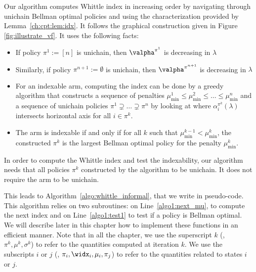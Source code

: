 Our algorithm computes Whittle index in increasing order by navigating through unichain Bellman optimal policies and using the characterization provided by Lemma~\ref{ch:cpt:lem:idx}.
It follows the graphical construction given in Figure \ref{fig:illustrate_vf}. It uses the following facts:
\begin{itemize}
    \item If policy $\pi^1:=[n]$ is unichain, then $\valpha^{\pi^1}$ is decreasing in $\lambda$
    \item Similarly, if policy $\pi^{n+1}:=\emptyset$ is unichain, then $\valpha^{\pi^{n+1}}$ is decreasing in $\lambda$
    \item For an indexable arm, computing the index can be done by a greedy algorithm that constructs a sequence of penalties $\mu^1_{\min}\le\mu^2_{\min}\le\dots\le\mu^n_{\min}$ and a sequence of unichain policies $\pi^1\supsetneq\dots\supsetneq\pi^{n}$ by looking at where $\alpha^{\pi^k}_i(\lambda)$ intersects horizontal axis for all $i\in\pi^k$.
    \item The arm is indexable if and only if for all $k$ such that $\mu^{k-1}_{\min}<\mu^{k}_{\min}$, the constructed $\pi^k$ is the largest Bellman optimal policy for the penalty $\mu^k_{\min}$.
\end{itemize}
In order to compute the Whittle index and test the indexability, our algorithm needs that all policies $\pi^k$ constructed by the algorithm to be unichain.
It does not require the arm to be unichain. 

This leads to Algorithm~\ref{algo:whittle_informal}, that we write in pseudo-code.
This algorithm relies on two subroutines: on Line~\ref{algo1:next_mu}, to compute the next index and on Line~\ref{algo1:test1} to test if a policy is Bellman optimal.
We will describe later in this chapter how to implement these functions in an efficient manner.
Note that in all the chapter, we use the superscript $k$ (\ie, $\pi^k, \mu^k, \sigma^k$) to refer to the quantities computed at iteration $k$.
We use the subscripts $i$ or $j$ (\ie, $\pi_i, \widx_i, \mu_i, \pi_j$) to refer to the quantities related to states $i$ or $j$.

